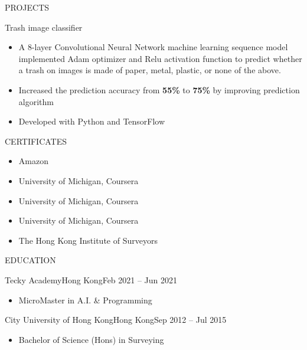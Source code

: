 \documentclass[]{resume}
\begin{document}
	\begin{cvsection}{PROJECTS}
		\begin{cvsubsection}{Trash image classifier}{}{}
			\begin{itemize}
			    \item A 8-layer Convolutional Neural Network machine learning sequence model implemented Adam optimizer and Relu activation function to predict whether a trash on images is made of paper, metal, plastic, or none of the above. 
			    \item Increased the prediction accuracy from \textbf{55\%} to \textbf{75\%} by improving prediction algorithm
			    \item Developed with Python and TensorFlow 
			\end{itemize}
		\end{cvsubsection}
	\end{cvsection}
	
	\begin{cvsection}{CERTIFICATES}
		\begin{cvsubsection}{}{}{}
		    \begin{itemize}
            \item \noindent {} \hfill {Amazon} \hfill {}
            \newline \noindent {} \hfill {} \hfill \llap{}
		        \item \noindent {} \hfill {University of Michigan, Coursera}\hfill {}
		        \item \noindent {} \hfill {University of Michigan, Coursera}\hfill {}
		        \item \noindent {} \hfill {University of Michigan, Coursera}\hfill {}
		        \item \noindent {} \hfill {The Hong Kong Institute of Surveyors}\hfill {}
		    \end{itemize}
		\end{cvsubsection}
	\end{cvsection}

	\begin{cvsection}{EDUCATION}
		\begin{cvsubsection}{Tecky Academy}{Hong Kong}{Feb 2021 -- Jun 2021}
			\begin{itemize}
				\item MicroMaster in A.I. \& Programming
			\end{itemize}
		\end{cvsubsection}
		
		\begin{cvsubsection}{City University of Hong Kong}{Hong Kong}{Sep 2012 -- Jul 2015}
			\begin{itemize}
				\item Bachelor of Science (Hons) in Surveying
			\end{itemize}
		\end{cvsubsection}
	\end{cvsection}
	
\end{document}
